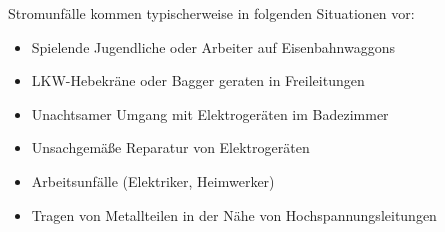 Stromunfälle kommen typischerweise in folgenden Situationen vor:
\begin{itemize}
  \item Spielende Jugendliche oder Arbeiter auf Eisenbahnwaggons
  \item LKW-Hebekräne oder Bagger geraten in Freileitungen
  \item Unachtsamer Umgang mit Elektrogeräten im Badezimmer
  \item Unsachgemäße Reparatur von Elektrogeräten
  \item Arbeitsunfälle (Elektriker, Heimwerker)
  \item Tragen von  Metallteilen in der Nähe von Hochspannungsleitungen
\end{itemize}



